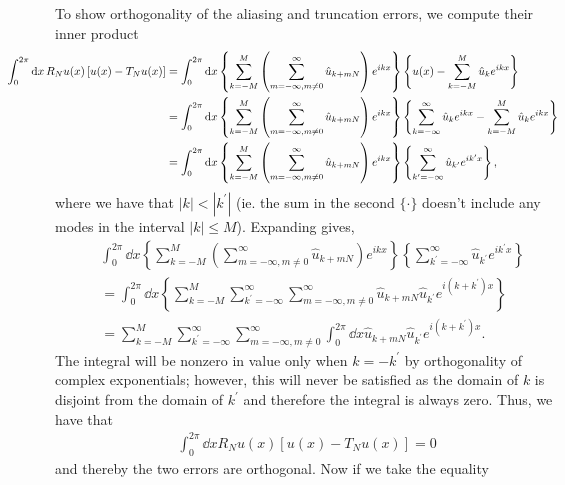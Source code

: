 \documentclass[12pt]{article}
\begin{document}
To show orthogonality of the aliasing and truncation errors, we compute their inner product
\begin{subequations}
	\begin{align}
		\hspace*{-1.5cm}\int_{0}^{2\pi}\dd{x}R_{N}u(x)\left[u(x)-T_{N}u(x)\right] &= \int_{0}^{2\pi}\dd{x}\left\{\sum_{k=-M}^{M} \left(\sum_{m=-\infty,m\neq 0}^{\infty} \hat{u}_{k+mN}\right)e^{ikx}\right\}\left\{u(x)-\sum_{k=-M}^{M}\hat{u}_{k}e^{ikx}\right\}\\
		&= \int_{0}^{2\pi}\dd{x}\left\{\sum_{k=-M}^{M} \left(\sum_{m=-\infty,m\neq 0}^{\infty} \hat{u}_{k+mN}\right)e^{ikx}\right\}\left\{\sum_{k=-\infty}^{\infty}\hat{u}_{k}e^{ikx}-\sum_{k=-M}^{M}\hat{u}_{k}e^{ikx}\right\}\\
		&= \int_{0}^{2\pi}\dd{x}\left\{\sum_{k=-M}^{M} \left(\sum_{m=-\infty,m\neq 0}^{\infty} \hat{u}_{k+mN}\right)e^{ikx}\right\}\left\{\sum_{k^{\prime}=-\infty}^{\infty}\hat{u}_{k^{\prime}}e^{ik^{\prime}x}\right\},
	\end{align}
\end{subequations}
where we have that $|k| < |k^{\prime}|$ (ie. the sum in the second $\{\cdot\}$ doesn't include any modes in the interval $|k| \le M$). Expanding gives,
\begin{subequations}
	\begin{align}
		&\int_{0}^{2\pi}\dd{x}\left\{\sum_{k=-M}^{M} \left(\sum_{m=-\infty,m\neq 0}^{\infty} \hat{u}_{k+mN}\right)e^{ikx}\right\}\left\{\sum_{k^{\prime}=-\infty}^{\infty}\hat{u}_{k^{\prime}}e^{ik^{\prime}x}\right\}\\
		&= \int_{0}^{2\pi}\dd{x}\left\{\sum_{k=-M}^{M}\sum_{k^{\prime}=-\infty}^{\infty}\sum_{m=-\infty,m\neq 0}^{\infty} \hat{u}_{k+mN}\hat{u}_{k^{\prime}}e^{i(k+k^{\prime})x}\right\}\\
		&= \sum_{k=-M}^{M}\sum_{k^{\prime}=-\infty}^{\infty}\sum_{m=-\infty,m\neq 0}^{\infty} \int_{0}^{2\pi}\dd{x}\hat{u}_{k+mN}\hat{u}_{k^{\prime}}e^{i(k+k^{\prime})x}.
	\end{align}
\end{subequations}
The integral will be nonzero in value only when $k=-k^{\prime}$ by orthogonality of complex exponentials; however, this will never be satisfied as the domain of $k$ is disjoint from the domain of $k^{\prime}$ and therefore the integral is always zero. Thus, we have that 
\begin{align}
	\int_{0}^{2\pi}\dd{x}R_{N}u(x)\left[u(x)-T_{N}u(x)\right] = 0
\end{align}
and thereby the two errors are orthogonal. Now if we take the equality
\end{document}
